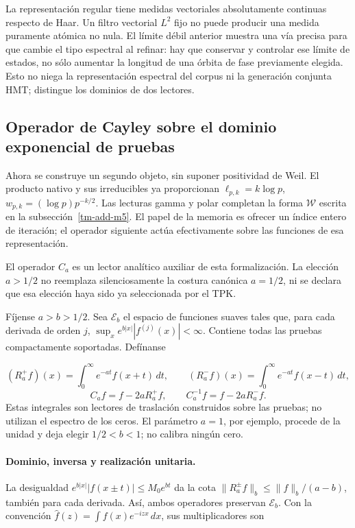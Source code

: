 La representación regular tiene medidas vectoriales absolutamente continuas respecto de Haar. Un filtro vectorial \(L^2\) fijo no puede producir una medida puramente atómica no nula. El límite débil anterior muestra una vía precisa para que cambie el tipo espectral al refinar: hay que conservar y controlar ese límite de estados, no sólo aumentar la longitud de una órbita de fase previamente elegida. Esto no niega la representación espectral del corpus ni la generación conjunta HMT; distingue los dominios de dos lectores.


\subsection{Operador de Cayley sobre el dominio exponencial de pruebas}
\label{tm-add-m4}
Ahora se construye un segundo objeto, sin suponer positividad de Weil. El producto nativo y sus irreducibles ya proporcionan \(\ell_{p,k}=k\log p\), \(w_{p,k}=(\log p)p^{-k/2}\). Las lecturas gamma y polar completan la forma \(\mathscr W\) escrita en la subsección~\ref{tm-add-m5}. El papel de la memoria es ofrecer un índice entero de iteración; el operador siguiente actúa efectivamente sobre las funciones de esa representación.

El operador \(C_a\) es un lector analítico auxiliar de esta formalización. La elección \(a>1/2\) no reemplaza silenciosamente la costura canónica \(a=1/2\), ni se declara que esa elección haya sido ya seleccionada por el TPK.

Fíjense \(a>b>1/2\). Sea \(\mathscr E_b\) el espacio de funciones suaves tales que, para cada derivada de orden \(j\), \(\sup_x e^{b|x|}|f^{(j)}(x)|<\infty\). Contiene todas las pruebas compactamente soportadas. Defínanse

\[
(R_a^+f)(x)=\int_0^\infty e^{-at}f(x+t)\,dt,
\qquad
(R_a^-f)(x)=\int_0^\infty e^{-at}f(x-t)\,dt,
\]
\[
\boxed{C_af=f-2aR_a^+f,\qquad C_a^{-1}f=f-2aR_a^-f.}
\]
Estas integrales son lectores de traslación construidos sobre las pruebas; no utilizan el espectro de los ceros. El parámetro \(a=1\), por ejemplo, procede de la unidad y deja elegir \(1/2<b<1\); no calibra ningún cero.

\paragraph{Dominio, inversa y realización unitaria.} La desigualdad \(e^{b|x|}|f(x\pm t)|\le M_0e^{bt}\) da la cota \(\|R_a^\pm f\|_b\le\|f\|_b/(a-b)\), también para cada derivada. Así, ambos operadores preservan \(\mathscr E_b\). Con la convención \(\widehat f(z)=\int f(x)e^{-izx}\,dx\), sus multiplicadores son

